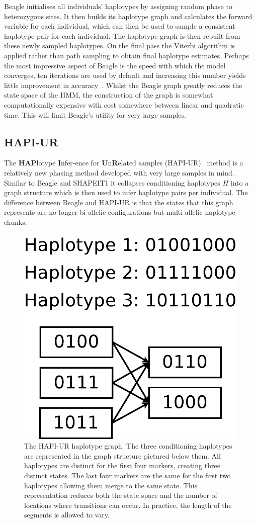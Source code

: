 Beagle initialises all individuals' haplotypes by assigning random phase to heterozygous sites.  It then builds its haplotype graph and calculates the forward variable for each individual, which can then be used to sample a consistent haplotype pair for each individual. The haplotype graph is then rebuilt from these newly sampled haplotypes.  On the final pass the Viterbi algorithm is applied rather than path sampling to obtain final haplotype estimates.  Perhaps the most impressive aspect of Beagle is the speed with which the model converges, ten iterations are used by default and increasing this number yields little improvement in accuracy~\citep{browning2007}.  Whilst the Beagle graph greatly reduces the state space of the HMM, the construction of the graph is somewhat computationally expensive with cost somewhere between linear and quadratic time.  This will limit Beagle's utility for very large samples.
\subsection{HAPI-UR}
The \textbf{HAP}lotype \textbf{I}nfer-ence for \textbf{U}n\textbf{R}elated samples (HAPI-UR)~\citep{williams2012phasing} method is a relatively new phasing method developed with very large samples in mind.  Similar to Beagle and SHAPEIT1 it collapses conditioning haplotypes $H$ into a graph structure which is then used to infer haplotype pairs per individual. The difference between Beagle and HAPI-UR is that the states that this graph represents are no longer bi-allelic configurations but multi-allelic haplotype chunks. 

\vspace{10pt}
\begin{figure}
                \centering
    \includegraphics[width=.45\textwidth]{chap3figs/hapiur}
  \caption[The HAPI-UR haplotype model]{The HAPI-UR haplotype graph.  The three conditioning haplotypes are represented in the graph structure pictured below them. All haplotypes are distinct for the first four markers, creating three distinct states.  The last four markers are the same for the first two haplotypes allowing them merge to the same state.  This representation reduces both the state space and the number of locations where transitions can occur. In practice, the length of the segments is allowed to vary.\label{chap3:hapiur}}
\end{figure}

